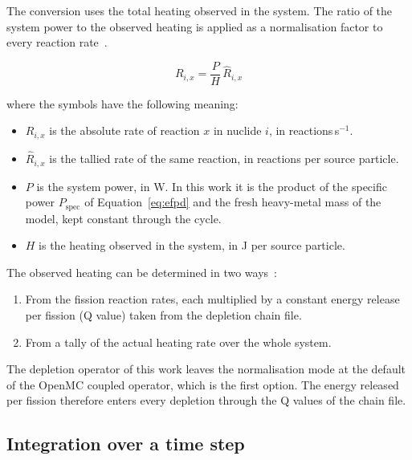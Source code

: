 The conversion uses the total heating observed in the system. The ratio
of the system power to the observed heating is applied as a
normalisation factor to every reaction
rate~\cite{romano_2021_depletion}.

\begin{equation}
R_{i,x} = \frac{P}{H}\,\hat{R}_{i,x}
\label{eq:dep-norm}
\end{equation}

\noindent where the symbols have the following meaning:

\begin{itemize}
  \item $R_{i,x}$ is the absolute rate of reaction $x$ in nuclide $i$,
        in reactions\,s$^{-1}$.

  \item $\hat{R}_{i,x}$ is the tallied rate of the same reaction, in
        reactions per source particle.

  \item $P$ is the system power, in W. In this work it is the product of
        the specific power $P_\mathrm{spec}$ of Equation~\eqref{eq:efpd}
        and the fresh heavy-metal mass of the model, kept constant
        through the cycle.

  \item $H$ is the heating observed in the system, in J per source
        particle.
\end{itemize}

The observed heating can be determined in two
ways~\cite{romano_2021_depletion}:

\begin{enumerate}
  \item From the fission reaction rates, each multiplied by a constant
        energy release per fission (Q value) taken from the depletion
        chain file.

  \item From a tally of the actual heating rate over the whole system.
\end{enumerate}

The depletion operator of this work leaves the normalisation mode at the
default of the OpenMC coupled operator, which is the first option. The
energy released per fission therefore enters every depletion through the
Q values of the chain file.

\subsection{Integration over a time step}
\label{sec:bg-dep-integ}

